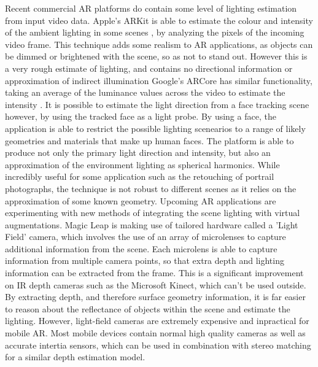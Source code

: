 \documentclass[ %
                    author={Gavin Parker},
                supervisor={Dr. Neill Campbell},
                    degree={MEng},
                     title={Deep Siamese Networks for Illumination Estimation from Stereo Images},
                  subtitle={},
                      type={research},
                      year={2018} ]{dissertation}
\begin{document}
\newline
Recent commercial AR platforms do contain some level of lighting estimation from input video data. Apple's ARKit is able to estimate the colour and intensity of the ambient lighting in some scenes \cite{arkit1}, by analyzing the pixels of the incoming video frame. This technique adds some realism to AR applications, as objects can be dimmed or brightened with the scene, so as not to stand out. However this is a very rough estimate of lighting, and contains no directional information or approximation of indirect illumination  Google's ARCore has similar functionality, taking an average of the luminance values across the video to estimate the intensity \cite{Debevec:1998:RSO:280814.280864}. It is possible to estimate the light direction from a face tracking scene however, by using the tracked face as a light probe. By using a face, the application is able to restrict the possible lighting scenearios to a range of likely geometries and materials that make up human faces. The platform is able to produce not only the primary light direction and intensity, but also an approximation of the environment lighting as spherical harmonics. While incredibly useful for some application such as the retouching of portrail photographs, the technique is not robust to different scenes as it relies on the approximation of some known geometry.
\newline
Upcoming AR applications are experimenting with new methods of integrating the scene lighting with virtual augmentations. Magic Leap is making use of tailored hardware called a 'Light Field' camera, which involves the use of an array of microlenses to capture additional information from the scene. Each microlens is able to capture information from multiple camera points, so that extra depth and lighting information can be extracted from the frame. This is a significant improvement on IR depth cameras such as the Microsoft Kinect, which can't be used outside. By extracting depth, and therefore surface geometry information, it is far easier to reason about the reflectance of objects within the scene and estimate the lighting. However, light-field cameras are extremely expensive and inpractical for mobile AR. Most mobile devices contain normal high quality cameras as well as accurate intertia sensors, which can be used in combination with stereo matching for a similar depth estimation model.
\end{document}
